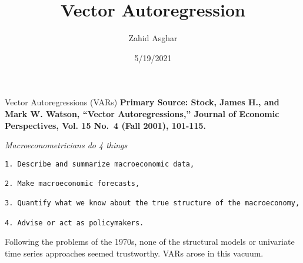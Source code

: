 \documentclass[
  ignorenonframetext,
]{beamer}
\title{Vector Autoregression}
\author{Zahid Asghar}
\date{5/19/2021}
\begin{document}
\frame{\titlepage}

\begin{frame}[fragile]{Vector Autoregressions (VARs)}
\protect\hypertarget{vector-autoregressions-vars}{}
\textbf{Primary Source: Stock, James H., and Mark W. Watson, ``Vector
Autoregressions,'' Journal of Economic Perspectives, Vol. 15 No.~4 (Fall
2001), 101-115.}

\emph{Macroeconometricians do 4 things}

\begin{verbatim}
1. Describe and summarize macroeconomic data, 

2. Make macroeconomic forecasts,  

3. Quantify what we know about the true structure of the macroeconomy, 

4. Advise or act as policymakers. 
\end{verbatim}

Following the problems of the 1970s, none of the structural models or
univariate time series approaches seemed trustworthy. VARs arose in this
vacuum.
\end{frame}
\end{document}
